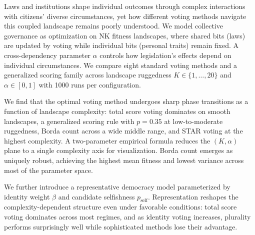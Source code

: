 Laws and institutions shape individual outcomes through complex interactions with
citizens' diverse circumstances, yet how different voting methods navigate this
coupled landscape remains poorly understood. We model collective governance as
optimization on NK fitness landscapes, where shared bits (laws) are updated by
voting while individual bits (personal traits) remain fixed. A cross-dependency
parameter $\alpha$ controls how legislation's effects depend on individual
circumstances. We compare eight standard voting methods and a generalized
scoring family across landscape ruggedness $K \in \{1,\ldots,20\}$ and
$\alpha \in [0,1]$ with 1000 runs per configuration.

We find that the optimal voting method undergoes sharp phase transitions as a
function of landscape complexity: total score voting dominates on smooth
landscapes, a generalized scoring rule with $p=0.35$ at low-to-moderate
ruggedness, Borda count across a wide middle range, and STAR voting at the
highest complexity. A two-parameter empirical formula reduces the
$(K, \alpha)$ plane to a single complexity axis for visualization. Borda count
emerges as uniquely robust, achieving the highest mean fitness and lowest
variance across most of the parameter space.

We further introduce a representative democracy model parameterized by identity
weight $\beta$ and candidate selfishness $p_{\mathrm{self}}$. Representation
reshapes the complexity-dependent structure even under favorable conditions: total
score voting dominates across most regimes, and as identity voting increases,
plurality performs surprisingly well while sophisticated methods lose their
advantage.
